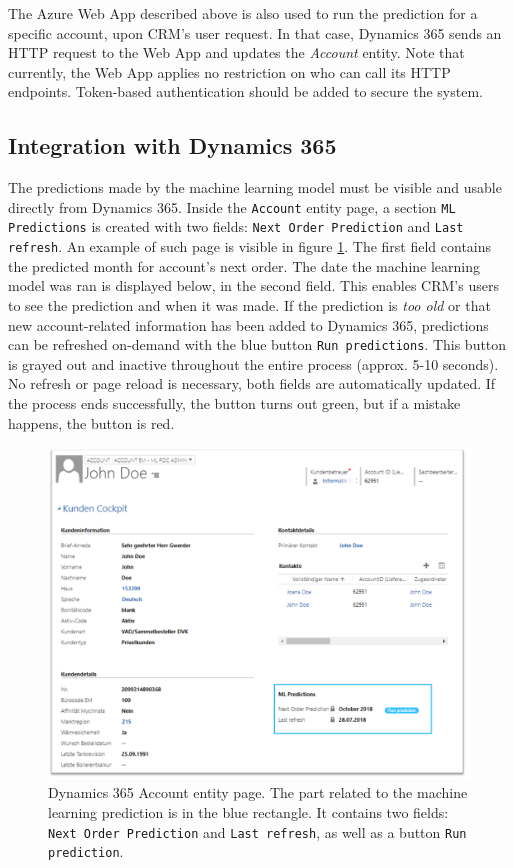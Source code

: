 The Azure Web App described above is also used to run the prediction for a specific account, upon CRM's user request. In that case, Dynamics 365 sends an HTTP request to the Web App and updates the \textit{Account} entity. Note that currently, the Web App applies no restriction on who can call its HTTP endpoints. Token-based authentication should be added to secure the system.

\subsection{Integration with Dynamics 365}
The predictions made by the machine learning model must be visible and usable directly from Dynamics 365. Inside the \texttt{Account} entity page, a section \texttt{ML Predictions} is created with two fields: \texttt{Next Order Prediction} and \texttt{Last refresh}. An example of such page is visible in figure \ref{fig:dynamics-account-ml-screenshot}. The first field contains the predicted month for account's next order. The date the machine learning model was ran is displayed below, in the second field. This enables CRM's users to see the prediction and when it was made. If the prediction is \textit{too old} or that new account-related information has been added to Dynamics 365, predictions can be refreshed on-demand with the blue button \texttt{Run predictions}. This button is grayed out and inactive throughout the entire process (approx. 5-10 seconds). No refresh or page reload is necessary, both fields are automatically updated. If the process ends successfully, the button turns out green, but if a mistake happens, the button is red.

\begin{figure}[!htb]
    \centering
    \includegraphics[width=12cm]{images/dynamics-account-ml-screenshot.png}
    \caption[Dynamics 365 \textit{Account} entity page]{Dynamics 365 Account entity page. The part related to the machine learning prediction is in the blue rectangle. It contains two fields: \texttt{Next Order Prediction} and \texttt{Last refresh}, as well as a button \texttt{Run prediction}.}
    \label{fig:dynamics-account-ml-screenshot}
\end{figure}

